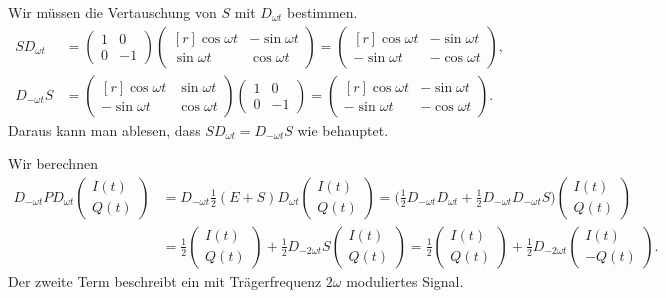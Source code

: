 \begin{loesung}
\begin{teilaufgaben}
Wir müssen die Vertauschung von $S$ mit $D_{\omega t}$ bestimmen.
\begin{align*}
SD_{\omega t}
&=
\begin{pmatrix}1&0\\0&-1\end{pmatrix}
\begin{pmatrix*}[r]
 \cos\omega t & -\sin\omega t \\
 \sin\omega t &  \cos\omega t
\end{pmatrix*}
=
\begin{pmatrix*}[r]
 \cos\omega t & -\sin\omega t \\
-\sin\omega t & -\cos\omega t
\end{pmatrix*},
\\
D_{-\omega t}S
&=
\begin{pmatrix*}[r]
  \cos\omega t &  \sin\omega t \\
 -\sin\omega t &  \cos\omega t
\end{pmatrix*}
\begin{pmatrix}1&0\\0&-1\end{pmatrix}
=
\begin{pmatrix*}[r]
  \cos\omega t & -\sin\omega t \\
 -\sin\omega t & -\cos\omega t
\end{pmatrix*}.
\end{align*}
Daraus kann man ablesen, dass
\(
SD_{\omega t}
=
D_{-\omega t}S
\)
wie behauptet.
\item
Wir berechnen 
\begin{align*}
D_{-\omega t}PD_{\omega t}\begin{pmatrix}I(t)\\Q(t)\end{pmatrix}
&=
D_{-\omega t}\frac12(E+S)D_{\omega t}\begin{pmatrix}I(t)\\Q(t)\end{pmatrix}
=
\biggl(
\frac12
D_{-\omega t}D_{\omega t}
+
\frac12
D_{-\omega t}D_{-\omega t}S
\biggr)
\begin{pmatrix}I(t)\\Q(t)\end{pmatrix}
\\
&=
\frac12
\begin{pmatrix}I(t)\\Q(t)\end{pmatrix}
+
\frac12
D_{-2\omega t}
S
\begin{pmatrix}I(t)\\Q(t)\end{pmatrix}
=
\frac12
\begin{pmatrix}I(t)\\Q(t)\end{pmatrix}
+
\frac12
D_{-2\omega t}
\begin{pmatrix}I(t)\\-Q(t)\end{pmatrix}.
\end{align*}
Der zweite Term beschreibt ein mit Trägerfrequenz $2\omega$ moduliertes Signal.
\qedhere
\end{teilaufgaben}
\end{loesung}

